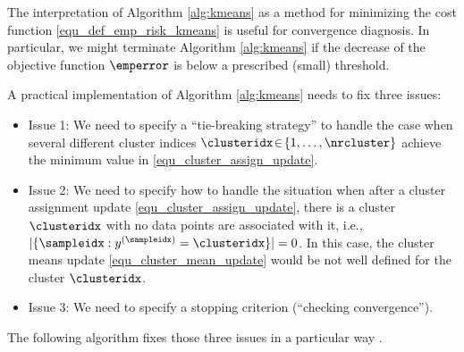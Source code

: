 \documentclass[12pt]{report}
\begin{document}
The interpretation of Algorithm \ref{alg:kmeans} as a method for 
minimizing the cost function \eqref{equ_def_emp_risk_kmeans} is 
useful for convergence diagnosis. In particular, we might terminate 
Algorithm \ref{alg:kmeans} if the decrease of the objective function 
$\emperror$ is below a prescribed (small) threshold. 
 
A practical implementation of Algorithm \ref{alg:kmeans} needs to fix three issues: 
\begin{itemize} 
\item Issue 1: We need to specify a ``tie-breaking strategy'' to 
handle the case when several different cluster indices 
$\clusteridx\!\in\!\{1,\ldots,\nrcluster\}$ achieve the minimum 
value in \eqref{equ_cluster_assign_update}. 
\item Issue 2: We need to specify how to handle the situation 
when after a cluster assignment update  \eqref{equ_cluster_assign_update}, 
there is a cluster $\clusteridx$ with no data points are associated 
with it, i.e., $|\{ \sampleidx: y^{(\sampleidx)} = \clusteridx \}|=0$. 
In this case, the cluster means update \eqref{equ_cluster_mean_update} 
would be not well defined for the cluster $\clusteridx$. 
\item Issue 3: We need to specify a stopping criterion (``checking convergence''). 
\end{itemize}
The following algorithm fixes those three issues in a particular way \cite{Gray1980}.  
\end{document}

